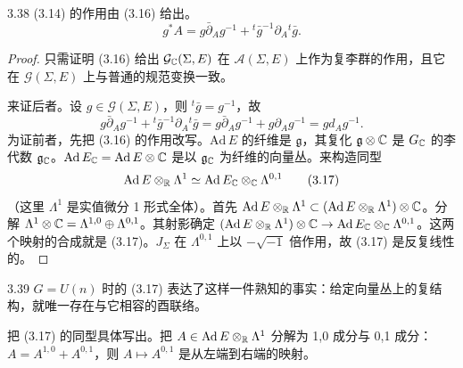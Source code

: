 \begin{proposition*}{3.38}
  (3.14) 的作用由 (3.16) 给出。
  \begin{equation}
    g^*A=g\bar\partial_Ag^{-1}+{}^t\bar g^{-1}\partial_A{}^t\bar g. \tag{3.16}
  \end{equation}
\end{proposition*}

\begin{proof}
  只需证明 (3.16) 给出 $\mathcal{G}_{\mathbb{C}}(\Sigma,E)$ 在 $\mathcal{A}(\Sigma,E)$ 上作为复李群的作用，且它在 $\mathcal{G}(\Sigma,E)$ 上与普通的规范变换一致。

  来证后者。设 $g\in\mathcal{G}(\Sigma,E)$，则 ${}^t\bar g=g^{-1}$，故
  \[
    g\bar\partial_Ag^{-1}+{}^t\bar g^{-1}\partial_A{}^t\bar g=g\bar\partial_Ag^{-1}+g\partial_Ag^{-1}=gd_Ag^{-1}.
  \]
  为证前者，先把 (3.16) 的作用改写。$\mathrm{Ad}\,E$ 的纤维是 $\mathfrak{g}$，其复化 $\mathfrak{g}\otimes\mathbb{C}$ 是 $G_{\mathbb{C}}$ 的李代数 $\mathfrak{g}_{\mathbb{C}}$。$\mathrm{Ad}\,E_{\mathbb{C}}=\mathrm{Ad}\,E\otimes\mathbb{C}$ 是以 $\mathfrak{g}_{\mathbb{C}}$ 为纤维的向量丛。来构造同型
  \begin{equation}
    \mathrm{Ad}\,E\otimes_{\mathbb{R}}\Lambda^1\simeq\mathrm{Ad}\,E_{\mathbb{C}}\otimes_{\mathbb{C}}\Lambda^{0,1} \tag{3.17}
  \end{equation}
  （这里 $\Lambda^1$ 是实值微分 1 形式全体）。首先 $\mathrm{Ad}\,E\otimes_{\mathbb{R}}\Lambda^1\subset(\mathrm{Ad}\,E\otimes_{\mathbb{R}}\Lambda^1)\otimes\mathbb{C}$。分解 $\Lambda^1\otimes\mathbb{C}=\Lambda^{1,0}\oplus\Lambda^{0,1}$。其射影确定 $(\mathrm{Ad}\,E\otimes_{\mathbb{R}}\Lambda^1)\otimes\mathbb{C}\to\mathrm{Ad}\,E_{\mathbb{C}}\otimes_{\mathbb{C}}\Lambda^{0,1}$。这两个映射的合成就是 (3.17)。$J_\Sigma$ 在 $\Lambda^{0,1}$ 上以 $-\sqrt{-1}$ 倍作用，故 (3.17) 是反复线性的。
\end{proof}

\begin{remark}{3.39}
  $G=U(n)$ 时的 (3.17) 表达了这样一件熟知的事实：给定向量丛上的复结构，就唯一存在与它相容的酉联络。
\end{remark}

把 (3.17) 的同型具体写出。把 $A\in\mathrm{Ad}\,E\otimes_{\mathbb{R}}\Lambda^1$ 分解为 1,0 成分与 0,1 成分：$A=A^{1,0}+A^{0,1}$，则 $A\mapsto A^{0,1}$ 是从左端到右端的映射。

